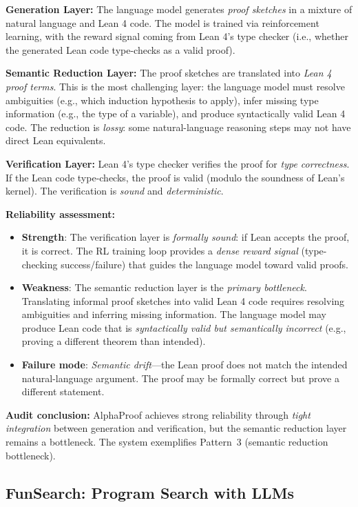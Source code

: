 \documentclass[11pt,a4paper]{article}
\begin{document}
\textbf{Generation Layer:} The language model generates \emph{proof sketches} in a mixture of natural language and Lean 4 code. The model is trained via reinforcement learning, with the reward signal coming from Lean 4's type checker (i.e., whether the generated Lean code type-checks as a valid proof).

\textbf{Semantic Reduction Layer:} The proof sketches are translated into \emph{Lean 4 proof terms}. This is the most challenging layer: the language model must resolve ambiguities (e.g., which induction hypothesis to apply), infer missing type information (e.g., the type of a variable), and produce syntactically valid Lean 4 code. The reduction is \emph{lossy}: some natural-language reasoning steps may not have direct Lean equivalents.

\textbf{Verification Layer:} Lean 4's type checker verifies the proof for \emph{type correctness}. If the Lean code type-checks, the proof is valid (modulo the soundness of Lean's kernel). The verification is \emph{sound} and \emph{deterministic}.

\textbf{Reliability assessment:}
\begin{itemize}
  \item \textbf{Strength}: The verification layer is \emph{formally sound}: if Lean accepts the proof, it is correct. The RL training loop provides a \emph{dense reward signal} (type-checking success/failure) that guides the language model toward valid proofs.
  \item \textbf{Weakness}: The semantic reduction layer is the \emph{primary bottleneck}. Translating informal proof sketches into valid Lean 4 code requires resolving ambiguities and inferring missing information. The language model may produce Lean code that is \emph{syntactically valid but semantically incorrect} (e.g., proving a different theorem than intended).
  \item \textbf{Failure mode}: \emph{Semantic drift}---the Lean proof does not match the intended natural-language argument. The proof may be formally correct but prove a different statement.
\end{itemize}

\textbf{Audit conclusion:} AlphaProof achieves strong reliability through \emph{tight integration} between generation and verification, but the semantic reduction layer remains a bottleneck. The system exemplifies Pattern~3 (semantic reduction bottleneck).

\subsection{FunSearch: Program Search with LLMs}
\end{document}
